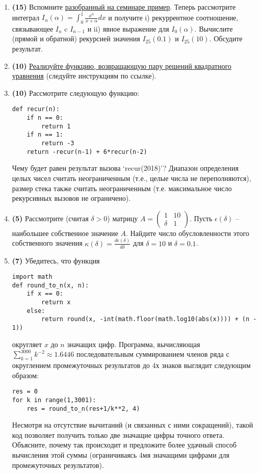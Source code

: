 \documentclass[10pt]{article}
\begin{document}
\begin{enumerate}
\item \textbf{(15)} Вспомните \href{https://github.com/ev-br/CP2020/blob/master/week_0_recurrence.ipynb}{разобранный на семинаре пример}. Теперь рассмотрите интеграл $I_n(\alpha) = \int_0^1 \frac{x^n}{x+\alpha} dx$ и получите i) рекуррентное соотношение, связывающее $I_{n}$ c $I_{n-1}$ и ii) явное выражение для $I_0(\alpha)$. Вычислите (прямой и обратной) рекурсией значения $I_{25}(0.1)$ и $I_{25}(10)$. Обсудите результат.
\item \textbf{(10)} \href{https://github.com/ev-br/CP2020/blob/master/week_1_quadratic.ipynb}{Реализуйте функцию, возвращающую пару решений квадратного уравнения} (следуйте инструкциям по ссылке).
\item \textbf{(10)} Рассмотрите следующую функцию:
\lstset{language=Python}
\lstset{frame=lines}
\lstset{basicstyle=\ttfamily}
\begin{lstlisting}
def recur(n):
    if n == 0:
        return 1
    if n == 1:
        return -3
    return -recur(n-1) + 6*recur(n-2)
\end{lstlisting}

Чему будет равен результат вызова `recur(2018)'? Диапазон определения целых чисел считать неограниченным (т.е., целые числа не переполняются), размер стека также считать неограниченным (т.е. максимальное число рекурсивных вызовов не ограничено).
\item \textbf{(5)} Рассмотрите (считая $\delta>0$) матрицу $A=\begin{pmatrix}
1 & 10 \\
\delta &1 
\end{pmatrix}$. Пусть $\epsilon(\delta)$ -- наибольшее собственное значение $A$. Найдите число обусловленности этого собственного значения $\kappa(\delta)=\frac{d\epsilon(\delta)}{d\delta}$ для $\delta=10$ и $\delta=0.1$.

\item \textbf{(7)} Убедитесь, что функция
\lstset{language=Python}
\lstset{frame=lines}
\lstset{basicstyle=\ttfamily}
\begin{lstlisting}
import math
def round_to_n(x, n): 
    if x == 0:
        return x
    else:
        return round(x, -int(math.floor(math.log10(abs(x)))) + (n - 1))
\end{lstlisting}
округляет $x$ до $n$ значащих цифр.
Программа, вычисляющая $\sum_{k=1}^{3000}k^{-2}\approx 1.6446$ последовательным суммированием членов ряда с округлением промежуточных результатов до 4х знаков выглядит следующим образом:
\lstset{language=Python}
\lstset{frame=lines}
\lstset{basicstyle=\ttfamily}
\begin{lstlisting}
res = 0
for k in range(1,3001):
    res = round_to_n(res+1/k**2, 4)
\end{lstlisting}
Несмотря на отсутствие вычитаний (и связанных с ними сокращений), такой код позволяет получить только две значащие цифры точного ответа. Объясните, почему так происходит и предложите более удачный способ вычисления этой суммы (ограничиваясь 4мя значащими цифрами для промежуточных результатов).
\end{enumerate}
\end{document}
